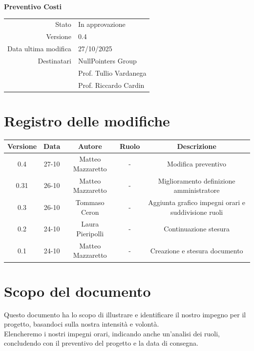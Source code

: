 \documentclass{article}
\begin{document}
	\vspace{2cm}
	
	{
		\centering
		\Huge\bfseries Preventivo Costi\par
		\vspace{0.5cm}
	}
	
	\begin{center}
		\begin{tabular}{r|l}
			Stato & In approvazione \\
			Versione & 0.4 \\
			Data ultima modifica & 27/10/2025 \\
			Destinatari & NullPointers Group \\
			& Prof. Tullio Vardanega \\
			& Prof. Riccardo Cardin \\
		\end{tabular}
	\end{center}
	
	\newpage
	\section{Registro delle modifiche}
	
	\begin{table}[htbp]
		\begin{tabular}{|c|c|c|c|c|}
			\hline
			\rowcolor[gray]{0.9}
			Versione & Data & Autore & Ruolo & Descrizione \\
			\hline
			0.4 & 27-10 & Matteo Mazzaretto & - & Modifica preventivo \\ 
			\hline
			0.31 & 26-10 & Matteo Mazzaretto & - & Miglioramento definizione amministratore \\ 
			\hline
			0.3 & 26-10 & Tommaso Ceron & - & Aggiunta grafico impegni orari e suddivisione ruoli \\ 
			\hline
			0.2 & 24-10 & Laura Pieripolli & - & Continuazione stesura \\ 
			\hline
			0.1 & 24-10 & Matteo Mazzaretto & - & Creazione e stesura documento \\ 
			\hline
		\end{tabular}
	\end{table}
	
	\newpage
	
	\section{Scopo del documento}
	Questo documento ha lo scopo di illustrare e identificare il nostro impegno per il progetto, basandoci sulla nostra intensità e volontà.\\
	Elencheremo i nostri impegni orari, indicando anche un'analisi dei ruoli, concludendo con il preventivo del progetto e la data di consegna.
	
\end{document}
